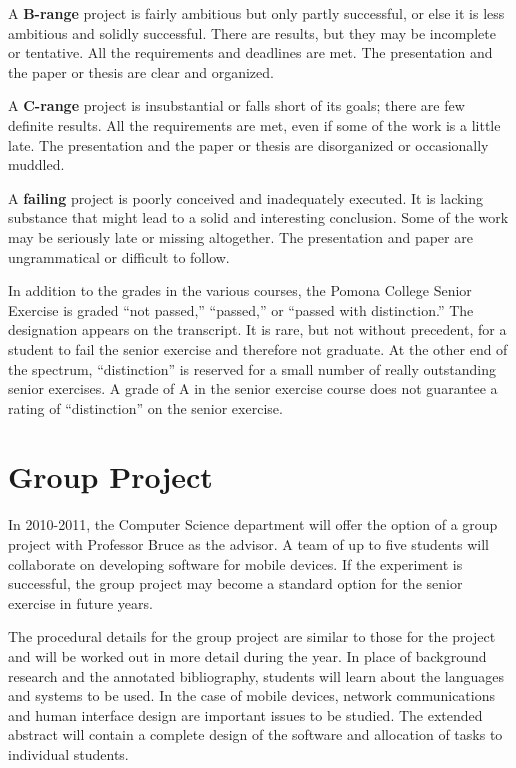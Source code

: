 \documentclass[finalcopy]{srpaper}
\let\phantomsection\relax
\begin{document}
A \textbf{B-range} project is fairly ambitious but only
partly successful, or else it is less ambitious and solidly
successful. There are results, but they may be incomplete or
tentative. All the requirements and deadlines are met. The
presentation and the paper or thesis are clear and
organized.

A \textbf{C-range} project is insubstantial or falls short
of its goals; there are few definite results. All the
requirements are met, even if some of the work is a little
late. The presentation and the paper or thesis are
disorganized or occasionally muddled.

A \textbf{failing} project is poorly conceived and
inadequately executed. It is lacking substance that might
lead to a solid and interesting conclusion. Some of the work
may be seriously late or missing altogether. The
presentation and paper are ungrammatical or difficult to
follow.

\phantomsection
In\label{Page:SeniorExerciseGrading} addition to the grades
in the various courses, the Pomona College Senior Exercise
is graded ``not passed,'' ``passed,'' or ``passed with
distinction.'' The designation appears on the transcript. It
is rare, but not without precedent, for a student to fail
the senior exercise and therefore not graduate. At the other
end of the spectrum, ``distinction'' is reserved for a small
number of really outstanding senior exercises. A grade of A
in the senior exercise course does not guarantee a rating of
``distinction'' on the senior exercise.


\section{Group Project}
In 2010-2011, the Computer Science department will offer the option 
of a group project with Professor Bruce as the advisor. A team of up
to five students will collaborate on developing software for mobile
devices. If the experiment is successful, the group project may become a
standard option for the senior exercise in future years.

The procedural details for the group project are similar to those for
the project and will be worked out in more detail during the year.
In place of background research and the annotated bibliography,
students will learn about the languages and systems to be used.
In the case of mobile devices, network communications and human
interface design are important issues to be studied. The extended
abstract will contain a complete design of the software and
allocation of tasks to individual students.
\end{document}
